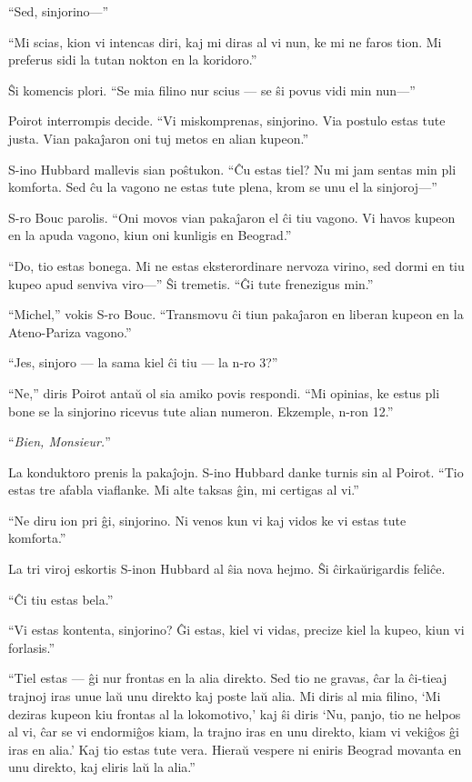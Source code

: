 ``Sed, sinjorino---''

``Mi scias, kion vi intencas diri, kaj mi diras al vi nun, ke mi ne faros tion. Mi preferus sidi la tutan nokton en la koridoro.''

Ŝi komencis plori. ``Se mia filino nur scius --- se ŝi povus vidi min nun---''

Poirot interrompis decide. ``Vi miskomprenas, sinjorino. Via postulo estas tute justa. Vian pakaĵaron oni tuj metos en alian kupeon.''

S-ino Hubbard mallevis sian poŝtukon. ``Ĉu estas tiel? Nu mi jam sentas min pli komforta. Sed ĉu la vagono ne estas tute plena, krom se unu el la sinjoroj---''

S-ro Bouc parolis. ``Oni movos vian pakaĵaron el ĉi tiu vagono. Vi havos kupeon en la apuda vagono, kiun oni kunligis en Beograd.''

``Do, tio estas bonega. Mi ne estas eksterordinare nervoza virino, sed dormi en tiu kupeo apud senviva viro---'' Ŝi tremetis. ``Ĝi tute frenezigus min.''

``Michel,'' vokis S-ro Bouc. ``Transmovu ĉi tiun pakaĵaron en liberan kupeon en la Ateno-Pariza vagono.''

``Jes, sinjoro --- la sama kiel ĉi tiu --- la n-ro 3?''

``Ne,'' diris Poirot antaŭ ol sia amiko povis respondi. ``Mi opinias, ke estus pli bone se la sinjorino ricevus tute alian numeron. Ekzemple, n-ron 12.''

``\emph{Bien, Monsieur.}''

La konduktoro prenis la pakaĵojn. S-ino Hubbard danke turnis sin al Poirot. ``Tio estas tre afabla viaflanke. Mi alte taksas ĝin, mi certigas al vi.''

``Ne diru ion pri ĝi, sinjorino. Ni venos kun vi kaj vidos ke vi estas tute komforta.''

La tri viroj eskortis S-inon Hubbard al ŝia nova hejmo. Ŝi ĉirkaŭrigardis feliĉe.

``Ĉi tiu estas bela.''

``Vi estas kontenta, sinjorino? Ĝi estas, kiel vi vidas, precize kiel la kupeo, kiun vi forlasis.''

``Tiel estas --- ĝi nur frontas en la alia direkto. Sed tio ne gravas, ĉar la ĉi-tieaj trajnoj iras unue laŭ unu direkto kaj poste laŭ alia. Mi diris al mia filino, `Mi deziras kupeon kiu frontas al la lokomotivo,' kaj ŝi diris `Nu, panjo, tio ne helpos al vi, ĉar se vi endormiĝos kiam, la trajno iras en unu direkto, kiam vi vekiĝos ĝi iras en alia.' Kaj tio estas tute vera. Hieraŭ vespere ni eniris Beograd movanta en unu direkto, kaj eliris laŭ la alia.''

